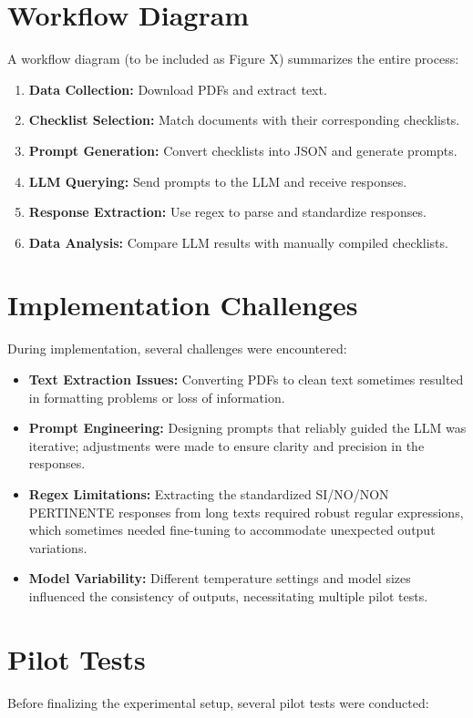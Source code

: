 \documentclass[../main.tex]{subfiles}
\begin{document}
\section{Workflow Diagram}
A workflow diagram (to be included as Figure X) summarizes the entire process:
\begin{enumerate}
    \item \textbf{Data Collection:} Download PDFs and extract text.
    \item \textbf{Checklist Selection:} Match documents with their corresponding checklists.
    \item \textbf{Prompt Generation:} Convert checklists into JSON and generate prompts.
    \item \textbf{LLM Querying:} Send prompts to the LLM and receive responses.
    \item \textbf{Response Extraction:} Use regex to parse and standardize responses.
    \item \textbf{Data Analysis:} Compare LLM results with manually compiled checklists.
\end{enumerate}
 

\section{Implementation Challenges}
During implementation, several challenges were encountered:

\begin{itemize}
    \item \textbf{Text Extraction Issues:}
 Converting PDFs to clean text sometimes resulted in formatting problems or loss of information.
    \item \textbf{Prompt Engineering:}
 Designing prompts that reliably guided the LLM was iterative; adjustments were made to ensure clarity and precision in the responses.
    \item \textbf{Regex Limitations:}
 Extracting the standardized SI/NO/NON PERTINENTE responses from long texts required robust regular expressions, which sometimes needed fine-tuning to accommodate unexpected output variations.
    \item \textbf{Model Variability:}
 Different temperature settings and model sizes influenced the consistency of outputs, necessitating multiple pilot tests.
\end{itemize}
 


\section{Pilot Tests}
Before finalizing the experimental setup, several pilot tests were conducted:
\end{document}

